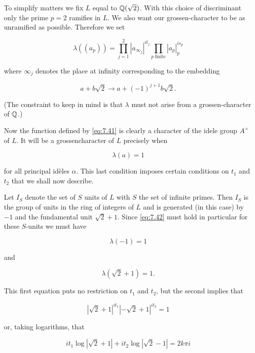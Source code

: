 To simplify matters we fix $L$ equal to $\mathbb{Q}(\sqrt{2})$. With this choice of discriminant only the prime $p = 2$ ramifies in $L$. We also want our grossen-character to be as unramified as possible. Therefore we set

\begin{equation}\label{eq:7.41}
\lambda((a_p)) = \prod_{j=1}^{2} |a_{\infty_j}|^{it_j} \prod_{p\ \mathrm{finite}} |a_p|_p^{is_p}\tag{7.41}
\end{equation}

where $\infty_j$ denotes the place at infinity corresponding to the embedding

\[
a + b\sqrt{2} \to a + (-1)^{j+1}b\sqrt{2}.
\]

(The constraint to keep in mind is that $\lambda$ must not arise from a grossen-character of $\mathbb{Q}$.)

Now the function defined by \eqref{eq:7.41} is clearly a character of the idele group $A^{\times}$ of $L$. It will be a grossencharacter of $L$ precisely when

\begin{equation}\label{eq:7.42}
\lambda(a) = 1\tag{7.42}
\end{equation}

for all principal id\`eles $\alpha$. This last condition imposes certain conditions on $t_1$ and $t_2$ that we shall now describe.

Let $I_S$ denote the set of $S$ units of $L$ with $S$ the set of infinite primes. Then $I_S$ is the group of units in the ring of integers of $L$ and is generated (in this case) by $-1$ and the fundamental unit $\sqrt{2} + 1$. Since \eqref{eq:7.42} must hold in particular for these $S$-units we must have

\begin{equation}\label{eq:7.43}
\lambda(-1) = 1\tag{7.43}
\end{equation}

and

\begin{equation}\label{eq:7.44}
\lambda(\sqrt{2} + 1) = 1.\tag{7.44}
\end{equation}

This first equation puts no restriction on $t_1$ and $t_2$, but the second implies that

\[
|\sqrt{2} + 1|^{it_1}|-\sqrt{2} + 1|^{it_2} = 1
\]

or, taking logarithms, that

\begin{equation}\label{eq:7.45}
it_1\log|\sqrt{2} + 1| + it_2\log|\sqrt{2} - 1| = 2k\pi i\tag{7.45}
\end{equation}

